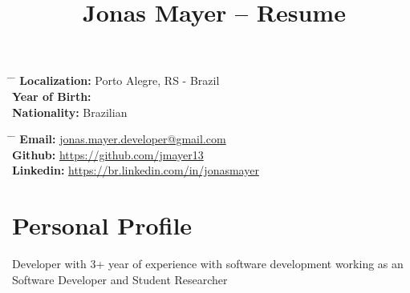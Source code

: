 \documentclass[10pt]{article} %
\begin{document}

\title{Jonas Mayer -- Resume} %


\parbox{0.5\textwidth}{ %
\begin{tabbing} %
\hspace{3cm} \= \hspace{4cm} \= \kill %
{\bf Localization:} \> Porto Alegre, RS - Brazil\\ %
{\bf Year of Birth:}  \\ %
{\bf Nationality:} \> Brazilian %
\end{tabbing}}
\hfill %
\parbox{0.5\textwidth}{ %
\begin{tabbing} %
\hspace{2cm} \= \hspace{5cm} \= \kill %
{\bf Email:} \> \href{mailto:jonas.mayer.developer@gmail.com}{jonas.mayer.developer@gmail.com} \\ %
{\bf Github:} \> \href{https://github.com/jmayer13}{https://github.com/jmayer13} \\
{\bf Linkedin:} \> \href{https://br.linkedin.com/in/jonasmayer}{https://br.linkedin.com/in/jonasmayer} \\
\end{tabbing}}


\section{Personal Profile}

Developer with 3+ year of experience with software development working as an Software Developer and Student Researcher
\end{document}
